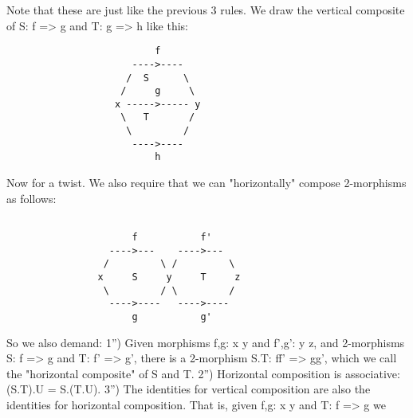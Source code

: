 Note that these are just like the previous 3 rules.  We draw the vertical
composite of S: f => g and T: g => h like this:

\begin{verbatim}
                          f
                      ---->----
                     /  S      \
                    /     g     \
                   x ----->----- y
                    \   T       /
                     \         /
                      ---->----
                          h

\end{verbatim}
    
Now for a twist.  We also require that we can "horizontally" compose
2-morphisms as follows:
\begin{verbatim}
 
                      f           f'
                  ---->---    ---->---
                 /         \ /         \
                x     S     y     T     z
                 \         / \         /
                  ---->----   ---->----
                      g           g'

\end{verbatim}
    
So we also demand:
1'') Given morphisms f,g: x \to  y and f',g': y \to  z, and 2-morphisms
S: f => g and T: f' => g', there is a 2-morphism S.T: ff' => gg', which we
call the "horizontal composite" of S and T.
2'') Horizontal composition is associative:  (S.T).U = S.(T.U).
3'') The identities for vertical composition are also the identities for
horizontal composition.  That is, given f,g: x \to  y and T: f => g we


